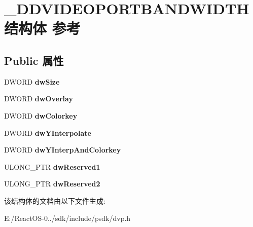 \hypertarget{struct___d_d_v_i_d_e_o_p_o_r_t_b_a_n_d_w_i_d_t_h}{}\section{\+\_\+\+D\+D\+V\+I\+D\+E\+O\+P\+O\+R\+T\+B\+A\+N\+D\+W\+I\+D\+T\+H结构体 参考}
\label{struct___d_d_v_i_d_e_o_p_o_r_t_b_a_n_d_w_i_d_t_h}
\subsection*{Public 属性}
\begin{DoxyCompactItemize}
\item 
\mbox{\label{struct___d_d_v_i_d_e_o_p_o_r_t_b_a_n_d_w_i_d_t_h_a1c32b8908b2dd8965948180e40340ecf}} 
D\+W\+O\+RD {\bfseries dw\+Size}
\item 
\mbox{\label{struct___d_d_v_i_d_e_o_p_o_r_t_b_a_n_d_w_i_d_t_h_aea7faa043f28b5eea443938aa93119d9}} 
D\+W\+O\+RD {\bfseries dw\+Overlay}
\item 
\mbox{\label{struct___d_d_v_i_d_e_o_p_o_r_t_b_a_n_d_w_i_d_t_h_ab49f0d54a59d6984f30c7619f907ffc3}} 
D\+W\+O\+RD {\bfseries dw\+Colorkey}
\item 
\mbox{\label{struct___d_d_v_i_d_e_o_p_o_r_t_b_a_n_d_w_i_d_t_h_ade617e9bf409ea107a82e3e32f77ea5a}} 
D\+W\+O\+RD {\bfseries dw\+Y\+Interpolate}
\item 
\mbox{\label{struct___d_d_v_i_d_e_o_p_o_r_t_b_a_n_d_w_i_d_t_h_a08d54213a5b5b07fa7c5f9bafe94a6e6}} 
D\+W\+O\+RD {\bfseries dw\+Y\+Interp\+And\+Colorkey}
\item 
\mbox{\label{struct___d_d_v_i_d_e_o_p_o_r_t_b_a_n_d_w_i_d_t_h_a93a15b478583201af0825dec5b18532f}} 
U\+L\+O\+N\+G\+\_\+\+P\+TR {\bfseries dw\+Reserved1}
\item 
\mbox{\label{struct___d_d_v_i_d_e_o_p_o_r_t_b_a_n_d_w_i_d_t_h_a159b1405202f508c2848311ef4404aef}} 
U\+L\+O\+N\+G\+\_\+\+P\+TR {\bfseries dw\+Reserved2}
\end{DoxyCompactItemize}


该结构体的文档由以下文件生成\+:\begin{DoxyCompactItemize}
\item 
E\+:/\+React\+O\+S-\/0../sdk/include/psdk/dvp.\+h\end{DoxyCompactItemize}
